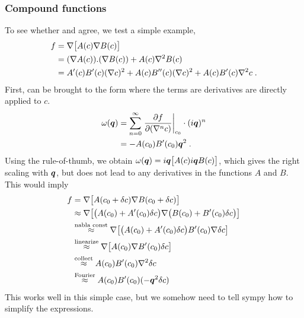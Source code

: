\documentclass[
	superscriptaddress,
	twocolumn,
	aps, pre
]{revtex4-1}
\newcommand{\vq}{\vect q}
\newcommand{\dc}{\delta c}
\begin{document}
\subsubsection{Compound functions}
To see whether  and  agree, we test a simple example,
\begin{align}
	f &= \nabla\bigl[A(c) \nabla B(c)\bigr]
\notag\\
	 &=(\nabla A(c)). (\nabla B(c))  + A(c) \nabla^2 B(c)
\notag\\
	 &= A'(c)B'(c) (\nabla c)^2  + A(c)B''(c) (\nabla c)^2 + A(c)B'(c) \nabla^2 c
	\;.
\end{align}
First,  can be brought to the form where the terms are derivatives are directly applied to $c$.
\begin{align}
	\omega(\vq) &= \sum_{n=0}^\infty \takenat{\pfrac{f}{(\nabla^n c)}}{c_0}\cdot (i\vect q)^n
\notag\\
	&= - A(c_0)B'(c_0) \vq^2
	\;.
\end{align}
Using the rule-of-thumb, we obtain $\omega(\vq) = i\vq \bigl[A(c) i\vq B(c)\bigr]$, which gives the right scaling with $\vq$, but does not lead to any derivatives in the functions $A$ and $B$.
This would imply
\begin{align}
	f &= \nabla\bigl[A(c_0 + \dc) \nabla B(c_0 + \dc)\bigr]
\notag\\ & \approx
	\nabla\bigl[\bigl(A(c_0) + A'(c_0)\dc\bigr) \nabla\bigl(B(c_0) + B'(c_0) \dc\bigr)\bigr]
\notag\\ & \overset{\text{nabla const}}{\approx}
	\nabla\bigl[\bigl(A(c_0) + A'(c_0)\dc\bigr) B'(c_0)  \nabla \dc\bigr]
\notag\\ & \overset{\text{linearize}}{\approx}
	\nabla\bigl[A(c_0) \nabla B'(c_0) \dc\bigr]
\notag\\ & \overset{\text{collect}}{\approx}
	A(c_0) B'(c_0) \nabla^2 \dc
\notag\\ & \overset{\text{Fourier}}{\approx}
	A(c_0) B'(c_0) (-\vq^2 \dc)
\end{align}
This works well in this simple case, but we somehow need to tell sympy how to simplify the expressions.
\end{document}
